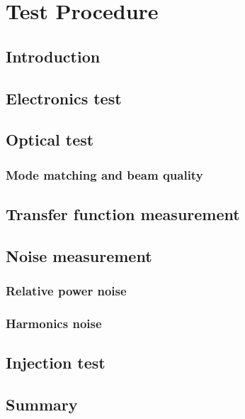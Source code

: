 
\chapter{Test Procedure} %

\label{Chapter1} %


\section{Introduction}
\section{Electronics test}
\section{Optical test}
\subsection{Mode matching and beam quality}
\section{Transfer function measurement}
\section{Noise measurement}
\subsection{Relative power noise}
\subsection{Harmonics noise}
\section{Injection test}
\section{Summary}


